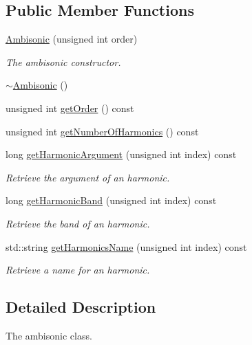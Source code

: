 \subsection*{Public Member Functions}
\begin{DoxyCompactItemize}
\item 
\hyperlink{class_hoa2_d_1_1_ambisonic_a43f91832422c0b59f92f02978dc1e541}{Ambisonic} (unsigned int order)
\begin{DoxyCompactList}\small\item\em The ambisonic constructor. \end{DoxyCompactList}\item 
\hyperlink{class_hoa2_d_1_1_ambisonic_a082fc2e3f9910703ddb49b9a478329bf}{$\sim$\-Ambisonic} ()
\item 
unsigned int \hyperlink{class_hoa2_d_1_1_ambisonic_a00797f96b864e2913567e08239ed9593}{get\-Order} () const 
\item 
unsigned int \hyperlink{class_hoa2_d_1_1_ambisonic_ae7cee18218c9bf00091d83e661d487ee}{get\-Number\-Of\-Harmonics} () const 
\item 
long \hyperlink{class_hoa2_d_1_1_ambisonic_a68c389087fb999101a499f6849b635f9}{get\-Harmonic\-Argument} (unsigned int index) const 
\begin{DoxyCompactList}\small\item\em Retrieve the argument of an harmonic. \end{DoxyCompactList}\item 
long \hyperlink{class_hoa2_d_1_1_ambisonic_a9485abf2b4f1b1aec8d0da9b12cf42ed}{get\-Harmonic\-Band} (unsigned int index) const 
\begin{DoxyCompactList}\small\item\em Retrieve the band of an harmonic. \end{DoxyCompactList}\item 
std\-::string \hyperlink{class_hoa2_d_1_1_ambisonic_a6b6f6ff74792f00bf5095dc9cfec28a4}{get\-Harmonics\-Name} (unsigned int index) const 
\begin{DoxyCompactList}\small\item\em Retrieve a name for an harmonic. \end{DoxyCompactList}\end{DoxyCompactItemize}


\subsection{Detailed Description}
The ambisonic class. 

